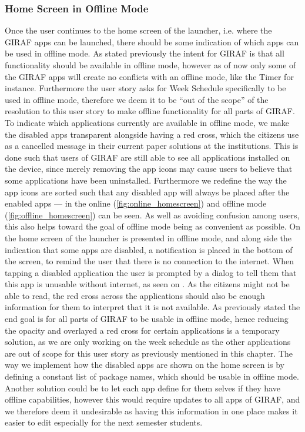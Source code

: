 \subsubsection{Home Screen in Offline Mode}
Once the user continues to the home screen of the launcher, i.e. where the GIRAF apps can be launched, there should be some indication of which apps can be used in offline mode. 
As stated previously the intent for GIRAF is that all functionality should be available in offline mode, however as of now only some of the GIRAF apps will create no conflicts with an offline mode, like the Timer for instance. 
Furthermore the user story asks for Week Schedule specifically to be used in offline mode, therefore we deem it to be \enquote{out of the scope} of the resolution to this user story to make offline functionality for all parts of GIRAF.
To indicate which applications currently are available in offline mode, we make the disabled apps transparent alongside having a red cross, which the citizens use as a cancelled message in their current paper solutions at the institutions.
This is done such that users of GIRAF are still able to see all applications installed on the device, since merely removing the app icons may cause users to believe that some applications have been uninstalled.
Furthermore we redefine the way the app icons are sorted such that any disabled app will always be placed after the enabled apps --- in  the online (\ref{fig:online_homescreen}) and offline mode (\ref{fig:offline_homescreen}) can be seen.
As well as avoiding confusion among users, this also helps toward the goal of offline mode being as convenient as possible.
On  the home screen of the launcher is presented in offline mode, and along side the indication that some apps are disabled, a notification is placed in the bottom of the screen, to remind the user that there is no connection to the internet.
When tapping a disabled application the user is prompted by a dialog to tell them that this app is unusable without internet, as seen on . 
As the citizens might not be able to read, the red cross across the applications should also be enough information for them to interpret that it is not available.
As previously stated the end goal is for all parts of GIRAF to be usable in offline mode, hence reducing the opacity and overlayed a red cross for certain applications is a temporary solution, as we are only working on the week schedule as the other applications are out of scope for this user story as previously mentioned in this chapter.
The way we implement how the disabled apps are shown on the home screen is by defining a constant list of package names, which should be usable in offline mode.
Another solution could be to let each app define for them selves if they have offline capabilities, however this would require updates to all apps of GIRAF, and we therefore deem it undesirable as having this information in one place makes it easier to edit especially for the next semester students.

